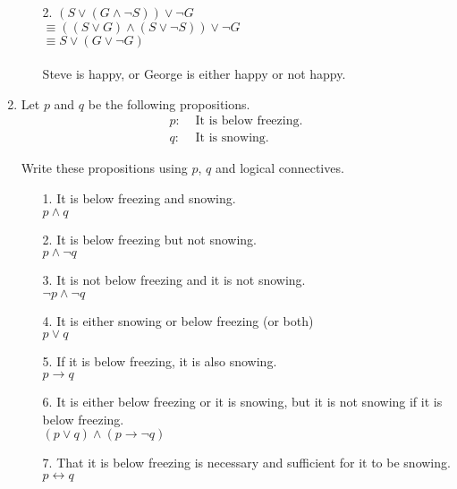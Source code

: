 \documentclass[11pt]{article}
\begin{document}
\begin{enumerate}
\begin{enumerate}
  \item[2.] \( (S \lor (G \land \neg S)) \lor \neg G \)\\
  $\equiv ((S \lor G) \land (S \lor \neg S)) \lor \neg G$\\
  $\equiv S \lor(G \lor \neg G)$\\
  \\
  Steve is happy, or George is either happy or not happy.\\

  \end{enumerate}

\newpage
\item Let $p$ and $q$ be the following propositions.
  \[\boxed{\begin{array}{rl}
      p: & \text{ It is below freezing.} \\
      q: & \text{ It is snowing.}
    \end{array}}\]

  Write these propositions using $p$, $q$ and logical connectives.
  \begin{enumerate}
  \item[1.] It is below freezing and snowing.\\
    \(p \land q\)\\
  \item[2.] It is below freezing but not snowing.\\
  \(p \land \neg q\)\\
  \item[3.] It is not below freezing and it is not snowing.\\
  \(\neg p \land \neg q\)\\
  \item[4.] It is either snowing or below freezing (or both)\\
      \(p \lor q\)\\
  \item[5.] If it is below freezing, it is also snowing.\\
      \(p \rightarrow q\)\\
  \item[6.] It is either below freezing or it is snowing, but it is not snowing if it is below freezing.\\
      \((p \lor q) \land (p \rightarrow \neg q)\)\\
  \item[7.] That it is below freezing is necessary and sufficient for it to be snowing.\\
    \(p \longleftrightarrow q\)\\
  \end{enumerate}


\end{enumerate}
\end{document}
